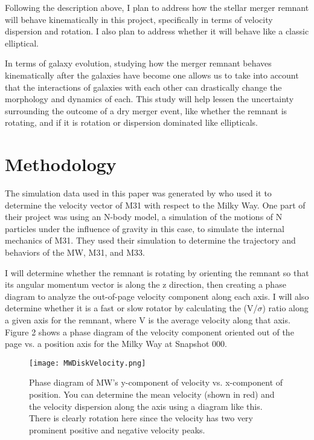 \documentclass[twocolumn]{aastex63}
\begin{document}
Following the description above, I plan to address how the stellar merger remnant will behave kinematically in this project, specifically in terms of velocity dispersion and rotation.  I also plan to address whether it will behave like a classic elliptical.  

In terms of galaxy evolution, studying how the merger remnant behaves kinematically after the galaxies have become one allows us to take into account that the interactions of galaxies with each other can drastically change the morphology and dynamics of each. This study will help lessen the uncertainty surrounding the outcome of a dry merger event, like whether the remnant is rotating, and if it is rotation or dispersion dominated like ellipticals.  

\section{Methodology} \label{sec:style}

The simulation data used in this paper was generated by \cite{2012ApJ...753....8V} who used it to determine the velocity vector of M31 with respect to the Milky Way.  One part of their project was using an N-body model, a simulation of the motions of N particles under the influence of gravity in this case, to simulate the internal mechanics of M31. They used their simulation to determine the trajectory and behaviors of the MW, M31, and M33.        

I will determine whether the remnant is rotating by orienting the remnant so that its angular momentum vector is along the z direction, then creating a phase diagram to analyze the out-of-page velocity component along each axis.  I will also determine whether it is a fast or slow rotator by calculating the (V/$\sigma$) ratio along a given axis for the remnant, where V is the average velocity along that axis.  Figure 2 shows a phase diagram of the velocity component oriented out of the page vs. a position axis for the Milky Way at Snapshot 000.    


\begin{figure}
    \centering
    \texttt{[image: MWDiskVelocity.png]}
    \caption{Phase diagram of MW's y-component of velocity vs. x-component of position.  You can determine the mean velocity (shown in red) and the velocity dispersion along the axis using a diagram like this.  There is clearly rotation here since the velocity has two very prominent positive and negative velocity peaks.}
    \label{fig:my_label}
\end{figure}
\end{document}
